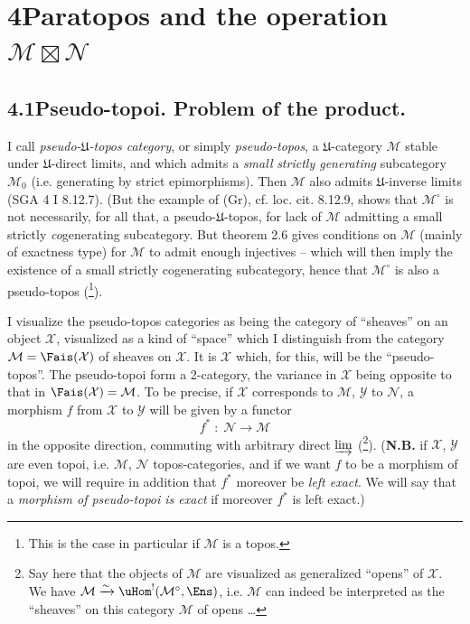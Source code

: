 

\section*{4\quad Paratopos and the operation $\mathcal{M}\boxtimes\mathcal{N}$}

\subsection*{4.1\quad Pseudo-topoi. Problem of the product.}

I call \textit{pseudo-$\mathfrak{U}$-topos category}, or simply \textit{pseudo-topos}, a $\mathfrak{U}$-category $\mathcal{M}$ stable under $\mathfrak{U}$-direct limits, and which admits a \textit{small} \textit{strictly generating} subcategory $\mathcal{M}_0$ (i.e. generating by strict epimorphisms). Then $\mathcal{M}$ also admits $\mathfrak{U}$-inverse limits (SGA 4 I 8.12.7). (But the example of (Gr), cf. loc. cit. 8.12.9, shows that $\mathcal{M}^\circ$ is not necessarily, for all that, a pseudo-$\mathfrak{U}$-topos, for lack of $\mathcal{M}$ admitting a small strictly \textit{co}generating subcategory. But theorem 2.6 gives conditions on $\mathcal{M}$ (mainly of exactness type) %
for $\mathcal{M}$ to admit enough injectives -- which will then imply the existence of a small strictly cogenerating subcategory, hence that $\mathcal{M}^\circ$ is also a pseudo-topos (\footnote{This is the case in particular if $\mathcal{M}$ is a topos.}).

I visualize the pseudo-topos categories as being the category of ``sheaves'' on an object $\mathcal{X}$, visualized as a kind of ``space'' which I distinguish from the category $\mathcal{M}=\Fais(\mathcal{X})$ of sheaves on $\mathcal{X}$. It is $\mathcal{X}$ which, for this, will be the ``pseudo-topos''. The pseudo-topoi form a 2-category, the variance in $\mathcal{X}$ being opposite to that in $\Fais(\mathcal{X})=\mathcal{M}$. To be precise, if $\mathcal{X}$ corresponds to $\mathcal{M}$, $\mathcal{Y}$ to $\mathcal{N}$, a morphism $f$ from $\mathcal{X}$ to $\mathcal{Y}$ will be given by a functor
\[
f^* \;:\; \mathcal{N} \longrightarrow \mathcal{M}
\tag*{(4.1.1)}
\]
in the opposite direction, commuting with arbitrary direct $\varinjlim$ (\footnote{Say here that the objects of $\mathcal{M}$ are visualized as generalized ``opens'' of $\mathcal{X}$. We have $\mathcal{M}\xrightarrow{\sim}\uHom^!(\mathcal{M}^\circ,\Ens)$, i.e. $\mathcal{M}$ can indeed be interpreted as the ``sheaves'' on this category $\mathcal{M}$ of opens \ldots}). (\textbf{N.B.} if $\mathcal{X}$, $\mathcal{Y}$ are even topoi, i.e. $\mathcal{M}$, $\mathcal{N}$ topos-categories, and if we want $f$ to be a morphism of topoi, we will require in addition that $f^*$ moreover be \textit{left exact}. We will say that a \textit{morphism of pseudo-topoi is exact} if moreover $f^*$ is left exact.)

